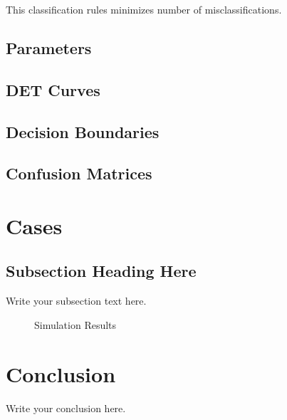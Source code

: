 \documentclass[11pt,a4paper]{article}
\begin{document}
This classification rules minimizes number of misclassifications. 
\subsection{Parameters}
\subsection{DET Curves}
\subsection{Decision Boundaries}
\subsection{Confusion Matrices}

\section{Cases}
\subsection{Subsection Heading Here}
Write your subsection text here.

\begin{figure}
    \centering
    \caption{Simulation Results}
    \label{simulationfigure}
\end{figure}

\section{Conclusion}
Write your conclusion here.
\end{document}
